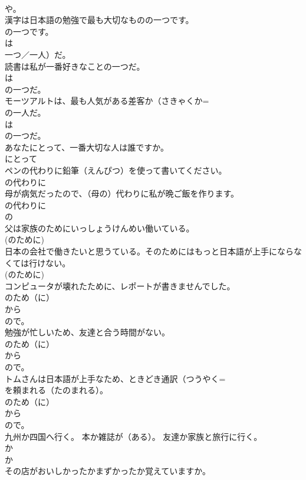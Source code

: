 \documentclass[8pt]{extreport}
\begin{document}
\begin{CJK}{UTF8}{min}
\\	や。 
\\	漢字は日本語の勉強で最も大切なものの一つです。	
\\	の一つです。 
\\	は
\\	{一つ／一人）だ。 
\\	読書は私が一番好きなことの一つだ。	
\\	は
\\	の一つだ。 
\\	モーツアルトは、最も人気がある差客か（さきゃくか=
\\	の一人だ。	
\\	は
\\	の一つだ。 
\\	あなたにとって、一番大切な人は誰ですか。	
\\	にとって 
\\	ペンの代わりに鉛筆（えんぴつ）を使って書いてください。	
\\	の代わりに 
\\	母が病気だったので、（母の）代わりに私が晩ご飯を作ります。	
\\	の代わりに 
\\	の 
\\	父は家族のためにいっしょうけんめい働いている。	
\\	(のために) 
\\	日本の会社で働きたいと思うている。そのためにはもっと日本語が上手にならなくては行けない。	
\\	(のために) 
\\	コンピュータが壊れたために、レポートが書きませんでした。	
\\	のため（に） 
\\	から 
\\	ので。
\\	勉強が忙しいため、友達と合う時間がない。	
\\	のため（に） 
\\	から 
\\	ので。
\\	トムさんは日本語が上手なため、ときどき通訳（つうやく=
\\	を頼まれる（たのまれる）。	
\\	のため（に） 
\\	から 
\\	ので。
\\	九州か四国へ行く。 本か雑誌が（ある）。 友達か家族と旅行に行く。	
\\	か 
\\	か 
\\	その店がおいしかったかまずかったか覚えていますか。	
}
\end{CJK}
\end{document}
